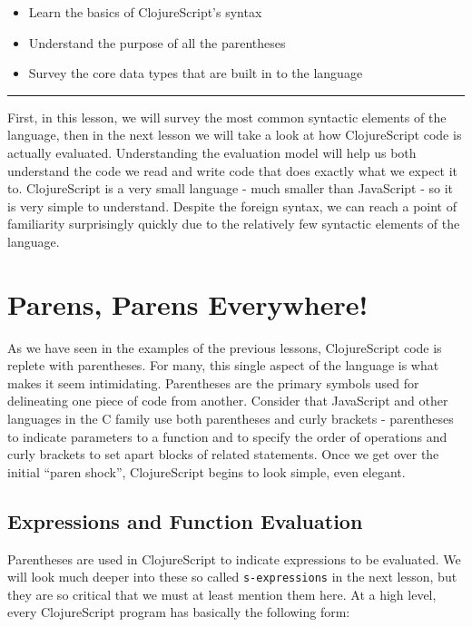 \documentclass[10pt,twoside,openright]{memoir}
\begin{document}
\begin{itemize}
\tightlist
\item
  Learn the basics of ClojureScript's syntax
\item
  Understand the purpose of all the parentheses
\item
  Survey the core data types that are built in to the language
\end{itemize}

\begin{center}\rule{0.5\linewidth}{0.5pt}\end{center}

First, in this lesson, we will survey the most common syntactic elements
of the language, then in the next lesson we will take a look at how
ClojureScript code is actually evaluated. Understanding the evaluation
model will help us both understand the code we read and write code that
does exactly what we expect it to. ClojureScript is a very small
language - much smaller than JavaScript - so it is very simple to
understand. Despite the foreign syntax, we can reach a point of
familiarity surprisingly quickly due to the relatively few syntactic
elements of the language.

\section{Parens, Parens Everywhere!}

As we have seen in the examples of the previous lessons, ClojureScript
code is replete with parentheses. For many, this single aspect of the
language is what makes it seem intimidating. Parentheses are the primary
symbols used for delineating one piece of code from another. Consider
that JavaScript and other languages in the C family use both parentheses
and curly brackets - parentheses to indicate parameters to a function
and to specify the order of operations and curly brackets to set apart
blocks of related statements. Once we get over the initial ``paren
shock'', ClojureScript begins to look simple, even elegant.

\subsection{Expressions and Function Evaluation}

Parentheses are used in ClojureScript to indicate expressions to be
evaluated. We will look much deeper into these so called
\texttt{s-expressions} in the next lesson, but they are so critical that
we must at least mention them here. At a high level, every ClojureScript
program has basically the following form:
\end{document}
